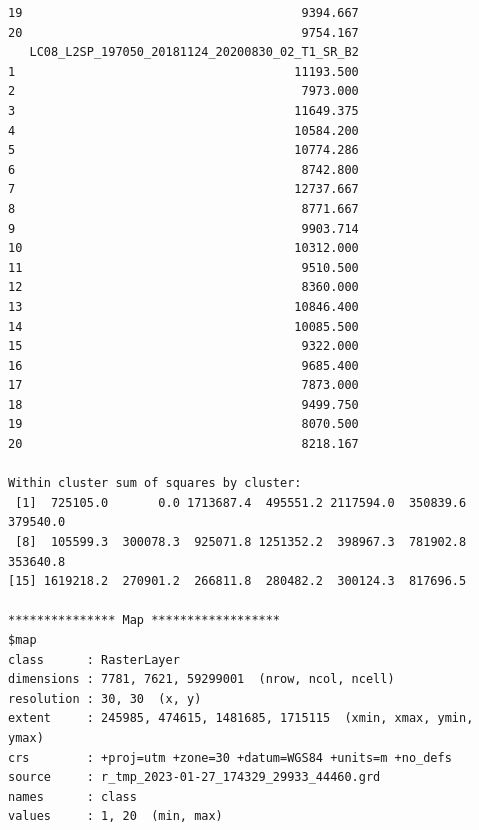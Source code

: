 \documentclass[remotesensing,article,submit,pdftex,moreauthors]{Definitions/mdpi}
\begin{document}
\begin{scriptsize}
\begin{verbatim}
19                                       9394.667
20                                       9754.167
   LC08_L2SP_197050_20181124_20200830_02_T1_SR_B2
1                                       11193.500
2                                        7973.000
3                                       11649.375
4                                       10584.200
5                                       10774.286
6                                        8742.800
7                                       12737.667
8                                        8771.667
9                                        9903.714
10                                      10312.000
11                                       9510.500
12                                       8360.000
13                                      10846.400
14                                      10085.500
15                                       9322.000
16                                       9685.400
17                                       7873.000
18                                       9499.750
19                                       8070.500
20                                       8218.167

Within cluster sum of squares by cluster:
 [1]  725105.0       0.0 1713687.4  495551.2 2117594.0  350839.6  379540.0
 [8]  105599.3  300078.3  925071.8 1251352.2  398967.3  781902.8  353640.8
[15] 1619218.2  270901.2  266811.8  280482.2  300124.3  817696.5

*************** Map ******************
$map
class      : RasterLayer 
dimensions : 7781, 7621, 59299001  (nrow, ncol, ncell)
resolution : 30, 30  (x, y)
extent     : 245985, 474615, 1481685, 1715115  (xmin, xmax, ymin, ymax)
crs        : +proj=utm +zone=30 +datum=WGS84 +units=m +no_defs 
source     : r_tmp_2023-01-27_174329_29933_44460.grd 
names      : class 
values     : 1, 20  (min, max)
\end{verbatim}
\end{scriptsize}
\end{document}
